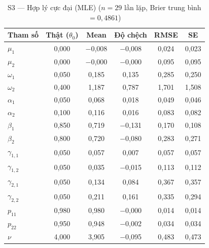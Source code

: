 \documentclass[11pt,a4paper]{article}
\begin{document}
\begin{table}[H]\centering\scriptsize
\caption{S3 --- Hợp lý cực đại (MLE) ($n=29$ lần lặp, Brier trung bình $=0{,}4861$)}
\begin{tabularx}{\textwidth}{l C C C C C}
\toprule
\textbf{Tham số} & \textbf{Thật ($\theta_0$)} & \textbf{Mean} & \textbf{Độ chệch} & \textbf{RMSE} & \textbf{SE} \\
\midrule
$\mu_1$ & 0{,}000 & $-$0{,}008 & $-$0{,}008 & 0{,}024 & 0{,}023 \\
$\mu_2$ & 0{,}000 & $-$0{,}000 & $-$0{,}000 & 0{,}095 & 0{,}095 \\
$\omega_1$ & 0{,}050 & 0{,}185 & 0{,}135 & 0{,}285 & 0{,}250 \\
$\omega_2$ & 0{,}400 & 1{,}187 & 0{,}787 & 1{,}701 & 1{,}508 \\
$\alpha_1$ & 0{,}050 & 0{,}068 & 0{,}018 & 0{,}049 & 0{,}046 \\
$\alpha_2$ & 0{,}100 & 0{,}116 & 0{,}016 & 0{,}083 & 0{,}082 \\
$\beta_1$ & 0{,}850 & 0{,}719 & $-$0{,}131 & 0{,}170 & 0{,}108 \\
$\beta_2$ & 0{,}800 & 0{,}720 & $-$0{,}080 & 0{,}283 & 0{,}271 \\
$\gamma_{1,1}$ & 0{,}050 & 0{,}057 & 0{,}007 & 0{,}057 & 0{,}057 \\
$\gamma_{1,2}$ & 0{,}050 & 0{,}035 & $-$0{,}015 & 0{,}113 & 0{,}112 \\
$\gamma_{2,1}$ & 0{,}050 & 0{,}134 & 0{,}084 & 0{,}367 & 0{,}357 \\
$\gamma_{2,2}$ & 0{,}050 & 0{,}211 & 0{,}161 & 0{,}335 & 0{,}294 \\
$p_{11}$ & 0{,}980 & 0{,}980 & $-$0{,}000 & 0{,}014 & 0{,}014 \\
$p_{22}$ & 0{,}950 & 0{,}948 & $-$0{,}002 & 0{,}034 & 0{,}034 \\
$\nu$ & 4{,}000 & 3{,}905 & $-$0{,}095 & 0{,}483 & 0{,}473 \\
\bottomrule
\end{tabularx}
\end{table}
\end{document}
